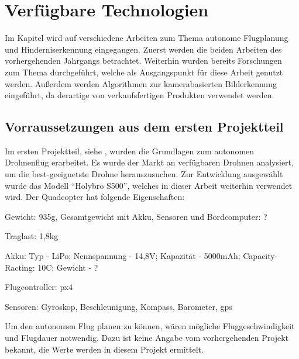 
\chapter{Verfügbare Technologien}
\label{chap:sota}

Im Kapitel wird auf verschiedene Arbeiten zum Thema autonome Flugplanung und Hinderniserkennung eingegangen. Zuerst werden die beiden Arbeiten des vorhergehenden Jahrgangs betrachtet. Weiterhin wurden bereits Forschungen zum Thema durchgeführt, welche als Ausgangspunkt für diese Arbeit genutzt werden. Außerdem werden Algorithmen zur kamerabasierten Bilderkennung eingeführt, da derartige von verkaufsfertigen Produkten verwendet werden. %

\section{Vorraussetzungen aus dem ersten Projektteil}
Im ersten Projektteil, siehe \cite{wirthErweiterungBestehendenDrohne2022}, wurden die Grundlagen zum autonomen Drohnenflug erarbeitet. Es wurde der Markt an verfügbaren Drohnen analysiert, um die best-geeignetste Drohne herauszusuchen\cite[Kapitel 3]{wirthErweiterungBestehendenDrohne2022}. Zur Entwicklung ausgewählt wurde das Modell \enquote{Holybro S500}\cite[Kapitel 4.3]{wirthErweiterungBestehendenDrohne2022}, welches in dieser Arbeit weiterhin verwendet wird. Der Quadcopter hat folgende Eigenschaften:
\begin{compactitem}
	\item Gewicht: 935g, Gesamtgewicht mit Akku, Sensoren und Bordcomputer: ?
	\item Traglast: 1,8kg
	\item Akku: Typ - LiPo; Nennspannung - 14,8V; Kapazität - 5000mAh; Capacity-Racting: 10C; Gewicht - ?
	\item Flugcontroller: \gls{px4}
	\item Sensoren: Gyroskop, Beschleunigung, Kompass, Barometer, \acrshort{gps}
\end{compactitem}

Um den autonomen Flug planen zu können, wären mögliche Fluggeschwindigkeit und Flugdauer notwendig. Dazu ist keine Angabe vom vorhergehenden Projekt bekannt, die Werte werden in diesem Projekt ermittelt.

